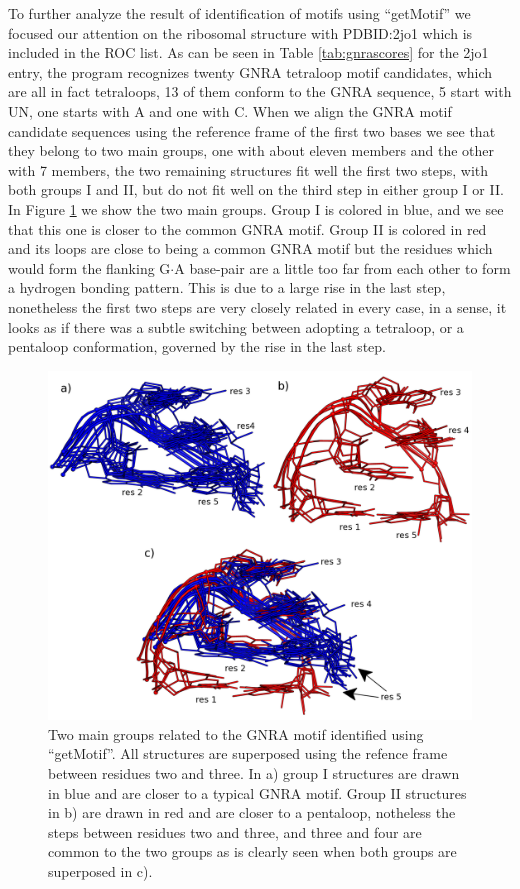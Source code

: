 To  further  analyze the  result  of  identification  of motifs  using
``getMotif'' we focused our  attention on the ribosomal structure with
PDBID:2jo1 which is included in the ROC list.  As can be seen in Table
\ref{tab:gnrascores} for the 2jo1 entry, the program recognizes twenty
GNRA tetraloop motif candidates, which  are all in fact tetraloops, 13
of them conform to the GNRA sequence, 5 start with UN, one starts with
A and  one with C.  When  we align the GNRA  motif candidate sequences
using the  reference frame  of the  first two bases  we see  that they
belong to two main groups, one with about eleven members and the other
with 7  members, the two remaining  structures fit well  the first two
steps, with  both groups I and  II, but do  not fit well on  the third
step in either group I or  II. In Figure \ref{fig:groupsB} we show the
two main groups. Group I is colored  in blue, and we see that this one
is closer to the common GNRA motif. Group II is colored in red and its
loops are  close to being a  common GNRA motif but  the residues which
would form the flanking G$\cdot$A  base-pair are a little too far from
each other to form a hydrogen  bonding pattern. This is due to a large
rise  in the  last  step, nonetheless  the  first two  steps are  very
closely related in every case, in a  sense, it looks as if there was a
subtle  switching  between  adopting   a  tetraloop,  or  a  pentaloop
conformation, governed by the rise in the last step.

\begin{figure}
\centering 
\includegraphics[angle=0, scale=0.5]{Chapter5/groupsB.png}
\caption{Two main  groups related to  the GNRA motif  identified using
  ``getMotif''. All structures are  superposed using the refence frame
  between residues two  and three. In a) group  I structures are drawn
  in blue and are closer to a typical GNRA motif.  Group II structures
  in b) are drawn in red  and are closer to a pentaloop, notheless the
  steps between residues two and  three, and three and four are common
  to the two groups as is clearly seen when both groups are superposed
  in c).}
\label{fig:groupsB}
\end{figure}

